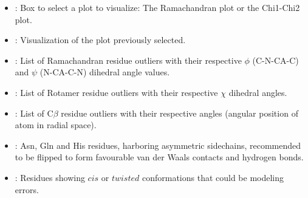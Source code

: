 \begin{itemize}
\begin{itemize}
\begin{itemize}
\begin{itemize}
          \item {}: Box to select a plot to visualize: The Ramachandran plot or the Chi1-Chi2 plot.
          \item {}: Visualization of the plot previously selected.
          \item {}: List of Ramachandran residue outliers with their respective $\phi$ (C-N-CA-C) and $\psi$ (N-CA-C-N) dihedral angle values.
          \item {}: List of Rotamer residue outliers with their respective $\chi$ dihedral angles.
          \item {}: List of C{$\beta$} residue outliers with their respective angles (angular position of  atom in radial space).
          \item {}: Asn, Gln and His residues, harboring asymmetric sidechains, recommended to be flipped to form favourable van der Waals contacts and hydrogen bonds.
          \item {}: Residues showing $cis$ or $twisted$ conformations that could be modeling errors.
         \end{itemize}


\end{itemize}
\end{itemize}
\end{itemize}
